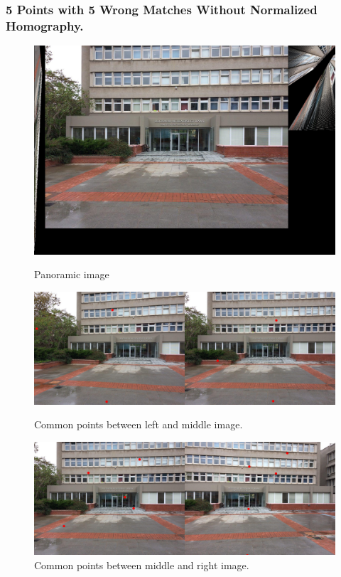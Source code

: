 \documentclass[letterpaper,12pt]{article}
\begin{document}
\subsubsection{5 Points with 5 Wrong Matches Without Normalized Homography.}
\begin{figure}[!htb]
        \centering\includegraphics[width=1\columnwidth]{experiments/5points/final5wrong.jpg}
          \caption{
                \label{} Panoramic image
        }
        \centering\includegraphics[width=1\columnwidth]{experiments/5points/left-1_middle5wrong.jpg}
          \caption{
                \label{} Common points between left and middle image.
        }
        \centering\includegraphics[width=1\columnwidth]{experiments/5points/middle_left-15wrong.jpg}
        \caption{
                \label{} Common points between middle and right image.
        }
\end{figure}
\FloatBarrier
\newpage
\end{document}
